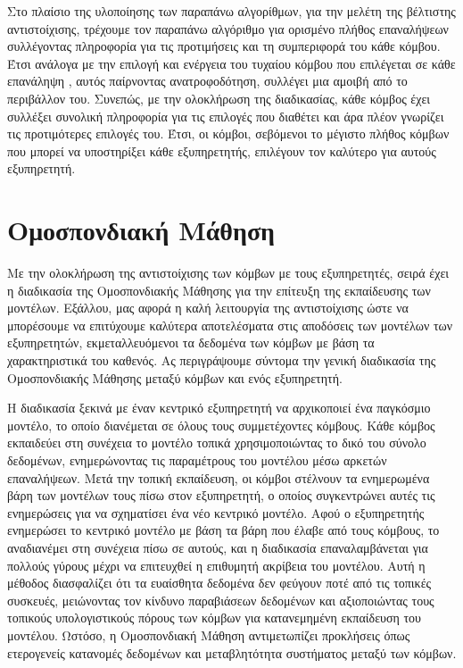 Στο πλαίσιο της υλοποίησης των παραπάνω αλγορίθμων, για την μελέτη της βέλτιστης αντιστοίχισης, τρέχουμε τον παραπάνω αλγόριθμο για ορισμένο πλήθος επαναλήψεων συλλέγοντας πληροφορία για τις προτιμήσεις και τη συμπεριφορά του κάθε κόμβου. Έτσι ανάλογα με την επιλογή και ενέργεια του τυχαίου κόμβου που επιλέγεται σε κάθε επανάληψη , αυτός παίρνοντας ανατροφοδότηση, συλλέγει μια αμοιβή από το περιβάλλον του. Συνεπώς, με την ολοκλήρωση της διαδικασίας, κάθε κόμβος έχει συλλέξει συνολική πληροφορία για τις επιλογές που διαθέτει και άρα πλέον γνωρίζει τις προτιμότερες επιλογές του. Έτσι, οι κόμβοι, σεβόμενοι το μέγιστο πλήθος κόμβων που μπορεί να υποστηρίξει κάθε εξυπηρετητής, επιλέγουν τον καλύτερο για αυτούς εξυπηρετητή.

\section{Ομοσπονδιακή Μάθηση}

Με την ολοκλήρωση της αντιστοίχισης των κόμβων με τους εξυπηρετητές, σειρά έχει η διαδικασία της Ομοσπονδιακής Μάθησης για την επίτευξη της εκπαίδευσης των μοντέλων. Εξάλλου, μας αφορά η καλή λειτουργία της αντιστοίχισης ώστε να μπορέσουμε να επιτύχουμε καλύτερα αποτελέσματα στις αποδόσεις των μοντέλων των εξυπηρετητών, εκμεταλλευόμενοι τα δεδομένα των κόμβων με βάση τα χαρακτηριστικά του καθενός. Ας περιγράψουμε σύντομα την γενική διαδικασία της Ομοσπονδιακής Μάθησης μεταξύ κόμβων και ενός εξυπηρετητή. 

Η διαδικασία ξεκινά με έναν κεντρικό εξυπηρετητή να αρχικοποιεί ένα παγκόσμιο μοντέλο, το οποίο διανέμεται σε όλους τους συμμετέχοντες κόμβους. Κάθε κόμβος εκπαιδεύει στη συνέχεια το μοντέλο τοπικά χρησιμοποιώντας το δικό του σύνολο δεδομένων, ενημερώνοντας τις παραμέτρους του μοντέλου μέσω αρκετών επαναλήψεων. Μετά την τοπική εκπαίδευση, οι κόμβοι στέλνουν τα ενημερωμένα βάρη των μοντέλων τους πίσω στον εξυπηρετητή, ο οποίος συγκεντρώνει αυτές τις ενημερώσεις για να σχηματίσει ένα νέο κεντρικό μοντέλο. Αφού ο εξυπηρετητής ενημερώσει το κεντρικό μοντέλο με βάση τα βάρη που έλαβε από τους κόμβους, το αναδιανέμει στη συνέχεια πίσω σε αυτούς, και η διαδικασία επαναλαμβάνεται για πολλούς γύρους μέχρι να επιτευχθεί η επιθυμητή ακρίβεια του μοντέλου. Αυτή η μέθοδος διασφαλίζει ότι τα ευαίσθητα δεδομένα δεν φεύγουν ποτέ από τις τοπικές συσκευές, μειώνοντας τον κίνδυνο παραβιάσεων δεδομένων και αξιοποιώντας τους τοπικούς υπολογιστικούς πόρους των κόμβων για κατανεμημένη εκπαίδευση του μοντέλου. Ωστόσο, η Ομοσπονδιακή Μάθηση αντιμετωπίζει προκλήσεις όπως ετερογενείς κατανομές δεδομένων και μεταβλητότητα συστήματος μεταξύ των κόμβων.

